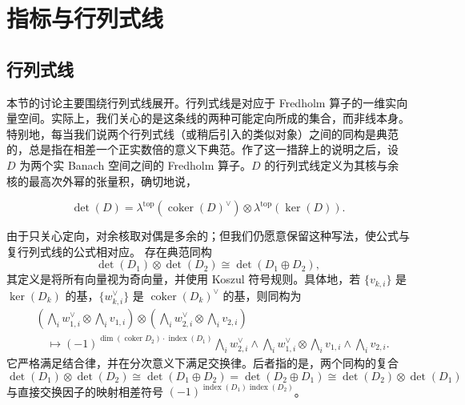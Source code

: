 \clearpage
\section{指标与行列式线}\label{sec:11}\label{section:11}
\subsection{行列式线}\label{sec:11a}
本节的讨论主要围绕行列式线展开。行列式线是对应于 Fredholm 算子的一维实向量空间。实际上，我们关心的是这条线的两种可能定向所成的集合，而非线本身。特别地，每当我们说两个行列式线（或稍后引入的类似对象）之间的同构是典范的，总是指在相差一个正实数倍的意义下典范。作了这一措辞上的说明之后，设 $D$ 为两个实 Banach 空间之间的 Fredholm 算子。$D$ 的行列式线定义为其核与余核的最高次外幂的张量积，确切地说，
\begin{definition*}
\[
\det(D)=\lambda^{\mathrm{top}}(\operatorname{coker}(D)^\vee)\otimes\lambda^{\mathrm{top}}(\ker(D)).
\]
\end{definition*}
由于只关心定向，对余核取对偶是多余的；但我们仍愿意保留这种写法，使公式与复行列式线的公式相对应。
存在典范同构
\begin{equation}\label{eq:11.1}
\det(D_1)\otimes\det(D_2)\cong\det(D_1\oplus D_2),
\end{equation}
其定义是将所有向量视为奇向量，并使用 Koszul 符号规则。具体地，若 $\{v_{k,\allowbreak i}\}$ 是 $\ker(D_k)$ 的基，$\{w_{k,\allowbreak i}^\vee\}$ 是 $\operatorname{coker}(D_k)^\vee$ 的基，则同构为
\begin{equation}\label{eq:11.2}
\begin{aligned}
&\left(\bigwedge_iw_{1,i}^\vee\otimes\bigwedge_iv_{1,i}\right)
\otimes\left(\bigwedge_iw_{2,i}^\vee\otimes\bigwedge_iv_{2,i}\right)\\
&\quad\longmapsto(-1)^{\dim(\operatorname{coker}D_2)\cdot\operatorname{index}(D_1)}
\bigwedge_iw_{2,i}^\vee\wedge\bigwedge_iw_{1,i}^\vee
\otimes\bigwedge_iv_{1,i}\wedge\bigwedge_iv_{2,i}.
\end{aligned}
\end{equation}
它严格满足结合律，并在分次意义下满足交换律。后者指的是，两个同构的复合
\[
\det(D_1)\otimes\det(D_2)\cong\det(D_1\oplus D_2)
=\det(D_2\oplus D_1)\cong\det(D_2)\otimes\det(D_1)
\]
与直接交换因子的映射相差符号 $(-1)^{\operatorname{index}(D_1)\operatorname{index}(D_2)}$。

